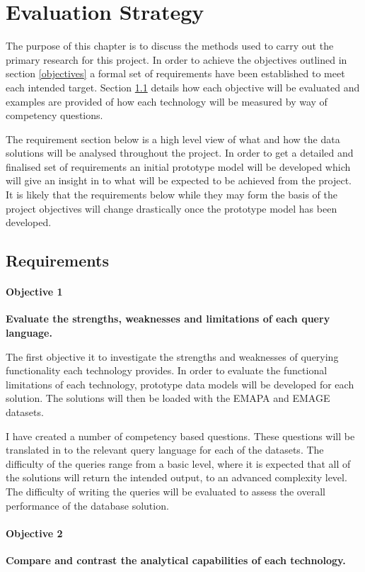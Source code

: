 \chapter{Evaluation Strategy}\label{evaluationstrategy}
The purpose of this chapter is to discuss the methods used to carry out the primary research for this project. In order to achieve the objectives outlined in section \ref{objectives} a formal set of requirements have been established to meet each intended target. Section \ref{requirements} details how each objective will be evaluated and examples are provided of how each technology will be measured by way of competency questions.

The requirement section below is a high level view of what and how the data solutions will be analysed throughout the project. In order to get a detailed and finalised set of requirements an initial prototype model will be developed which will give an insight in to what will be expected to be achieved from the project. It is likely that the requirements below while they may form the basis of the project objectives will change drastically once the prototype model has been developed.

\section{Requirements}\label{requirements}
\parindent 0pt
\subsubsection*{Objective 1}
\textbf{Evaluate the strengths, weaknesses and limitations of each query language.}

The first objective it to investigate the strengths and weaknesses of querying functionality each technology provides. In order to evaluate the functional limitations of each technology, prototype data models will be developed for each solution. The solutions will then be loaded with the EMAPA and EMAGE datasets.

I have created a number of competency based questions. These questions will be translated in to the relevant query language for each of the datasets. The difficulty of the queries range from a basic level, where it is expected that all of the solutions will return the intended output, to an advanced complexity level. The difficulty of writing the queries will be evaluated to assess the overall performance of the database solution.

\subsubsection*{Objective 2}
\textbf{Compare and contrast the analytical capabilities of each technology.}


